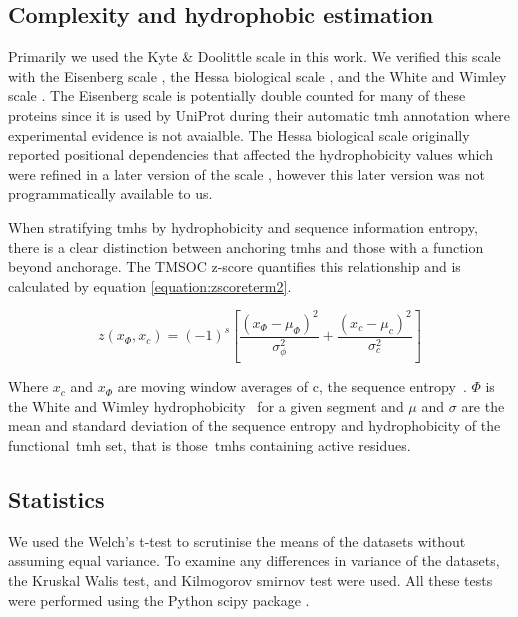 \subsection{Complexity and hydrophobic estimation}
Primarily we used the Kyte \& Doolittle scale in this work.
We verified this scale with the Eisenberg scale \cite{Eisenberg1984}, the Hessa biological scale \cite{Hessa2005}, and the White and Wimley scale \cite{White1999}.
The Eisenberg scale is potentially double counted for many of these proteins since it is used by UniProt during their automatic \gls{tmh} annotation where experimental evidence is not avaialble.
The Hessa biological scale originally reported positional dependencies that affected the hydrophobicity values which were refined in a later version of the scale \cite{Hessa2007}, however this later version was not programmatically available to us.

When stratifying \gls{tmh}s by hydrophobicity and sequence information entropy, there is a clear distinction between anchoring \gls{tmh}s and those with a function beyond anchorage.
The TMSOC z-score quantifies this relationship and is calculated by equation \ref{equation:zscoreterm2}.

\begin{equation} \label{zscoreterm2}
z({x}_{\Phi},{x}_{c})={(-1)}^{s}\left[\frac{{({x}_{\Phi}-{\mu}_{\Phi})}^{2}}{{\sigma}_{\phi}^{2}}+\frac{{({x}_{c}-{\mu}_{c})}^{2}}{{\sigma}_{c}^{2}}\right]
\end{equation}

Where $x_c$ and $x_\Phi$ are moving window averages of c, the sequence entropy~\cite{Wootton1996}. $\Phi$ is the White and Wimley hydrophobicity~\cite{White1999} for a given segment and $\mu$ and $\sigma$ are the mean and standard deviation of the sequence entropy and hydrophobicity of the functional~\gls{tmh} set, that is those~\gls{tmh}s containing active residues.

\subsection{Statistics}

We used the Welch's t\--test to scrutinise the means of the datasets without assuming equal variance.
To examine any differences in variance of the datasets, the Kruskal Walis test, and Kilmogorov smirnov test were used.
All these tests were performed using the Python scipy package \cite{Oliphant2007}.
